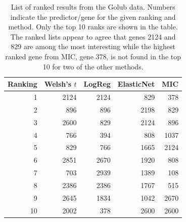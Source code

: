 \documentclass[oupdraft]{bio}
\begin{document}
\newpage

\begin{table}[tb]
\centering
\caption{List of ranked results from the Golub data. Numbers indicate
  the predictor/gene for the given ranking and method. Only the top 10
  ranks are shown in the table. The ranked lists appear to agree that
  genes 2124 and 829 are among the most interesting while the highest
  ranked gene from MIC, gene 378, is not found in the top 10 for two
  of the other methods.}
\label{tab1}
\begin{tabular}{rrrrr}
  \hline
Ranking & Welsh's $t$ & LogReg & ElasticNet & MIC \\ 
  \hline
1 & 2124 & 2124 & 829 & 378 \\ 
  2 & 896 & 896 & 2198 & 829 \\ 
  3 & 2600 & 829 & 2124 & 896 \\ 
  4 & 766 & 394 & 808 & 1037 \\ 
  5 & 829 & 766 & 1665 & 2124 \\ 
  6 & 2851 & 2670 & 1920 & 808 \\ 
  7 & 703 & 2939 & 1389 & 108 \\ 
  8 & 2386 & 2386 & 1767 & 515 \\ 
  9 & 2645 & 1834 & 1042 & 2670 \\ 
  10 & 2002 & 378 & 2600 & 2600 \\ 
   \hline
\end{tabular}
\end{table}
\end{document}
